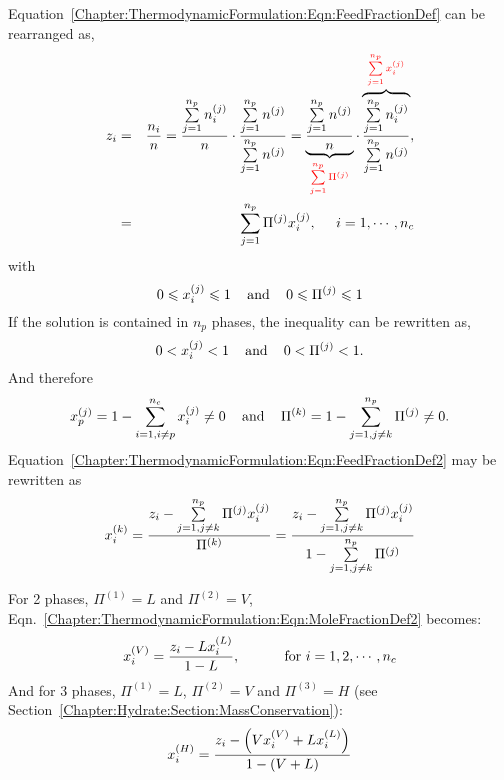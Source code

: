 Equation~\ref{Chapter:ThermodynamicFormulation:Eqn:FeedFractionDef} can be rearranged as,
\begin{eqnarray}
  z_{i} &=& \frc{n_{i}}{n} = \frc{\summation_{j=1}^{n_{p}}\mfr[n]{i}{j}}{n} \cdot \frc{\summation_{j=1}^{n_{p}}\mfr[n]{}{j}}{\summation_{j=1}^{n_{p}}\mfr[n]{}{j}} = \underbrace{\frc{ \summation_{j=1}^{n_{p}}\mfr[n]{}{j}}{n}}_{\red{\summation_{j=1}^{n_{p}}\mfr[\Pi]{}{j}}} \cdot \overbrace{ \frc{\summation_{j=1}^{n_{p}}\mfr[n]{i}{j}}{\summation_{j=1}^{n_{p}}\mfr[n]{}{j}}}^{\red{\summation_{j=1}^{n_{p}}\mfr[x]{i}{j}}}, \nonumber \\
       &=& \summation_{j=1}^{n_{p}} \mfr[\Pi]{}{j}\mfr[x]{i}{j},\;\;\;\;\;i=1, \cdots, n_{c}\hfill\label{Chapter:ThermodynamicFormulation:Eqn:FeedFractionDef2} 
\end{eqnarray}
with 
\begin{equation}
      0\leq \mfr[x]{i}{j} \leq 1 \;\;\;\text{ and }\;\;\; 0\leq\mfr[\Pi]{}{j}\leq 1 \hfill
\end{equation}
If the solution is contained in $n_{p}$ phases, the inequality can be rewritten as, 
\begin{equation}
    0 < \mfr[x]{i}{j} < 1 \;\;\;\text{ and }\;\;\;  0 < \mfr[\Pi]{}{j} < 1.
\end{equation}
And therefore
\begin{displaymath}
   \mfr[x]{p}{j} = 1 - \summation_{i=1,i\ne p}^{n_{c}}\mfr[x]{i}{j} \ne 0 \;\;\;\text{ and }\;\;\; \mfr[\Pi]{}{k} = 1 - \summation_{j=1,j\ne k}^{n_{p}}\mfr[\Pi]{}{j} \ne 0.
\end{displaymath}
Equation~\ref{Chapter:ThermodynamicFormulation:Eqn:FeedFractionDef2} may be rewritten as
\begin{equation}
   \mfr[x]{i}{k} = \frc{ z_{i} - \summation_{j=1,j\ne k}^{n_{p}} \mfr[\Pi]{}{j}\mfr[x]{i}{j}}{\mfr[\Pi]{}{k}} = \frc{ z_{i} - \summation_{j=1,j\ne k}^{n_{p}} \mfr[\Pi]{}{j}\mfr[x]{i}{j}}{ 1 - \summation_{j=1,j\ne k}^{n_{p}} \mfr[\Pi]{}{j}}\label{Chapter:ThermodynamicFormulation:Eqn:MoleFractionDef2}
\end{equation}

\begin{shaded}\noindent
   For 2 phases, $\Pi^{(1)}=L$ and $\Pi^{(2)}=V$, Eqn.~\ref{Chapter:ThermodynamicFormulation:Eqn:MoleFractionDef2} becomes:
     \begin{displaymath}
      \mfr[x]{i}{V} = \frc{z_{i}-L\mfr[x]{i}{L}}{1-L}, \hspace{1cm}\text{ for } i=1,2,\cdots,n_{c}
     \end{displaymath}
     And for 3 phases, $\Pi^{(1)}=L$, $\Pi^{(2)}=V$ and $\Pi^{(3)}=H$ (see Section~\ref{Chapter:Hydrate:Section:MassConservation}):
        \begin{displaymath}
           \mfr[x]{i}{H} = \frc{z_{i}-\left(V \mfr[x]{i}{V} + L \mfr[x]{i}{L}\right)}{1 - \left(V + L \right)}
        \end{displaymath}
\end{shaded}

